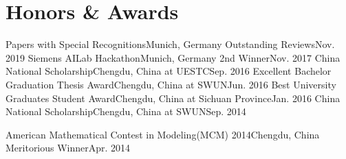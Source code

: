 
\section{\textbf{Honors \& Awards}}
  \resumeSubHeadingListStart
    \resumeSubheading
        {Papers with Special Recognitions}{Munich, Germany}
        {Outstanding Reviews}{Nov. 2019}
    \resumeSubheading
        {Siemens AILab Hackathon}{Munich, Germany}
        {2nd Winner}{Nov. 2017}
    \resumeSubheading
        {China National Scholarship}{Chengdu, China}
        {at UESTC}{Sep. 2016}
    \resumeSubheading
        {Excellent Bachelor Graduation Thesis Award}{Chengdu, China}
        {at SWUN}{Jun. 2016}
    \resumeSubheading
        {Best University Graduates Student Award}{Chengdu, China}
        {at Sichuan Province}{Jan. 2016}
    \resumeSubheading
        {China National Scholarship}{Chengdu, China}
        {at SWUN}{Sep. 2014}

    \resumeSubheading
        {American Mathematical Contest in Modeling(MCM) 2014}{Chengdu, China}
        {Meritorious Winner}{Apr. 2014}
  \resumeSubHeadingListEnd
